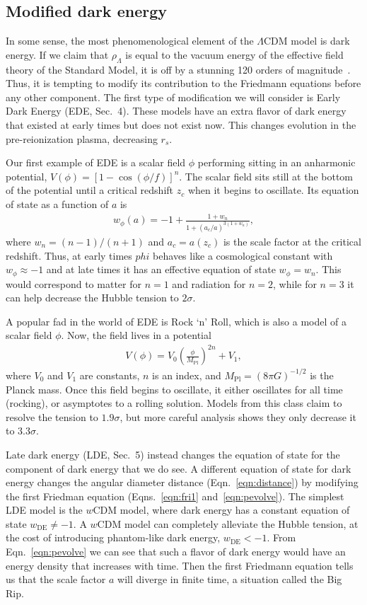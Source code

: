 \documentclass[12pt]{article}
\renewcommand{\L}{$\Lambda$}
\newcommand{\val}[1]{\cite{DiValentino2021} Sec.~#1}
\newcommand{\DE}{\text{DE}}
\begin{document}
\subsection{Modified dark energy} \label{sub:dark}

In some sense, the most phenomenological element of the \L CDM model is dark energy. If we claim that $\rho_\Lambda$ is equal to the vacuum energy of the effective field theory of the Standard Model, it is off by a stunning 120 orders of magnitude~\cite{Trodden2004}. Thus, it is tempting to modify its contribution to the Friedmann equations before any other component.
The first type of modification we will consider is Early Dark Energy (EDE, \val{4}). These models have an extra flavor of dark energy that existed at early times but does not exist now. This changes evolution in the pre-reionization plasma, decreasing $r_s$. 

Our first example of EDE is a scalar field $\phi$ performing sitting in an anharmonic potential, ${V(\phi) = [1-\cos(\phi/f)]^n}$. The scalar field sits still at the bottom of the potential until a critical redshift $z_c$ when it begins to oscillate. Its equation of state as a function of $a$ is
\begin{align}
w_\phi(a) = -1 + \frac{1+w_n}{1+ (a_c/a)^{3(1+w_n)}},
\end{align}
where $w_n = (n-1)/(n+1)$ and $a_c = a(z_c)$ is the scale factor at the critical redshift. Thus, at early times $phi$ behaves like a cosmological constant with $w_\phi\approx -1$ and at late times it has an effective equation of state $w_\phi=w_n$. This would correspond to matter for $n=1$ and radiation for $n=2$, while for $n=3$ it can help decrease the Hubble tension to $2\sigma$.

A popular fad in the world of EDE is Rock `n' Roll, which is also a model of a scalar field $\phi$. Now, the field lives in a potential
\begin{align}
V(\phi) = V_0\left(\frac{\phi}{M_\text{Pl}}\right)^{2n} + V_1,
\end{align}
where $V_0$ and $V_1$ are constants, $n$ is an index, and $M_\text{Pl} = (8\pi G)^{-1/2}$ is the Planck mass. Once this field begins to oscillate, it either oscillates for all time (rocking), or asymptotes to a rolling solution. Models from this class claim to resolve the tension to $1.9\sigma$, but more careful analysis shows they only decrease it to $3.3\sigma$.

Late dark energy (LDE, \val{5}) instead changes the equation of state for the component of dark energy that we do see. A different equation of state for dark energy changes the angular diameter distance (Eqn.~\ref{eqn:distance}) by modifying the first Friedman equation (Eqns.~\ref{eqn:fri1} and~\ref{eqn:pevolve}). The simplest LDE model is the $w$CDM model, where dark energy has a constant equation of state $w_\DE\ne-1$. A $w$CDM model can completely alleviate the Hubble tension, at the cost of introducing phantom-like dark energy, $w_\DE<-1$. From Eqn.~\ref{eqn:pevolve} we can see that such a flavor of dark energy would have an energy density that increases with time. Then the first Friedmann equation tells us that the scale factor $a$ will diverge in finite time, a situation called the Big Rip.
\end{document}
